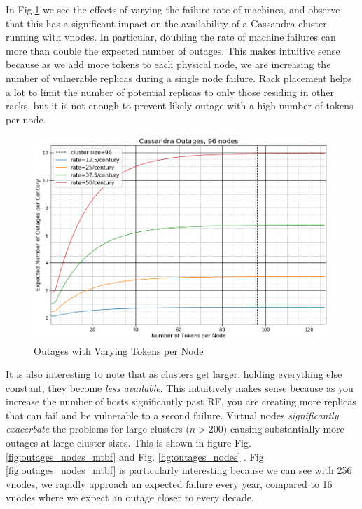 \documentclass{article}
\begin{document}
In Fig.\ref{fig:outages_all_vnodes} we see the effects of varying the failure
rate of machines, and observe that this has a significant impact on the
availability of a Cassandra cluster running with vnodes. In particular,
doubling the rate of machine failures can more than double the expected
number of outages. This makes intuitive sense because as we add more tokens
to each physical node, we are increasing the number of vulnerable replicas
during a single node failure. Rack placement helps a lot to limit the number
of potential replicas to only those residing in other racks, but it is not
enough to prevent likely outage with a high number of tokens per node.

\begin{figure}[H]
    \centering
    \includegraphics[width=1.0\textwidth]{images/outages_all_vnodes.png}
    \caption{Outages with Varying Tokens per Node}
    \label{fig:outages_all_vnodes}
\end{figure}

It is also interesting to note that as clusters get larger, holding everything
else constant, they become \textit{less available}. This intuitively makes
sense because as you increase the number of hosts significantly past RF,
you are creating more replicas that can fail and be vulnerable to a second
failure. Virtual nodes \textit{significantly exacerbate} the problems for
large clusters ($n > 200$) causing substantially more outages at large cluster
sizes. This is shown in figure Fig. \ref{fig:outages_nodes_mtbf} and
Fig. \ref{fig:outages_nodes} . Fig \ref{fig:outages_nodes_mtbf} is
particularly interesting because we can see with 256 vnodes, we rapidly
approach an expected failure every year, compared to 16 vnodes where we
expect an outage closer to every decade.
\end{document}
